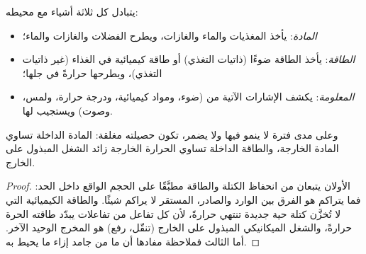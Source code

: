 \begin{proposition}\label{prop:b1:organism-environment:exchanges}
يتبادل كل  ثلاثة أشياء مع محيطه:
\begin{itemize}
  \item \emph{المادة}: يأخذ المغذيات والماء
        والغازات، ويطرح الفضلات والغازات والماء؛
  \item \emph{الطاقة}: يأخذ الطاقة ضوءًا (ذاتيات
        التغذي) أو طاقة كيميائية في الغذاء (غير ذاتيات التغذي)،
        ويطرحها حرارةً في جلها؛
  \item \emph{المعلومة}: يكشف الإشارات الآتية
        من  (ضوء، ومواد كيميائية، ودرجة حرارة، ولمس، وصوت)
        ويستجيب لها.
\end{itemize}
وعلى مدى فترة لا ينمو فيها  ولا يضمر، تكون حصيلته مغلقة:
المادة الداخلة تساوي المادة الخارجة، والطاقة الداخلة تساوي الحرارة
الخارجة زائد الشغل المبذول على الخارج.
\end{proposition}
\begin{proof}
الأولان يتبعان من انحفاظ الكتلة والطاقة مطبَّقًا على الحجم الواقع
داخل الحد: فما يتراكم هو الفرق بين الوارد والصادر، 
المستقر لا يراكم شيئًا. والطاقة الكيميائية التي لا تُخزَّن كتلة حية
جديدة تنتهي حرارةً، لأن كل تفاعل من تفاعلات  يبدّد طاقته
الحرة حرارةً، والشغل الميكانيكي المبذول على الخارج (تنقّل، رفع) هو
المخرج الوحيد الآخر. أما الثالث فملاحظة مفادها أن ما من 
جامد إزاء ما يحيط به.
\end{proof}

